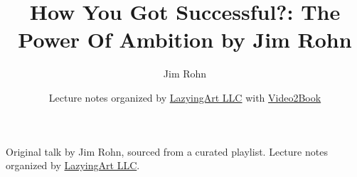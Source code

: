 \documentclass[11pt,oneside]{book}
\begin{document}
\frontmatter
\title{How You Got Successful?: The Power Of Ambition by Jim Rohn}
\author{Jim Rohn}
\date{Lecture notes organized by \href{https://lazying.art}{LazyingArt LLC} with \href{https://github.com/lachlanchen/Video2Book}{Video2Book}}
\maketitle
\begin{center}
\small Original talk by Jim Rohn, sourced from a curated playlist. Lecture notes organized by \href{https://lazying.art}{LazyingArt LLC}.
\end{center}
\clearpage
\mainmatter

\end{document}
